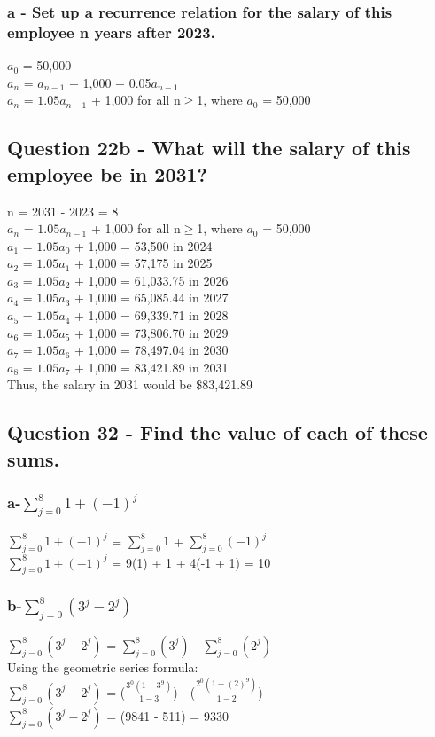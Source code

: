 \documentclass{article}
\begin{document}
\subsubsection[a]{a - Set up a recurrence relation for the salary of this employee n years after 2023.}
$a_0$ = 50,000\\
$a_n$ = $a_{n-1}$ + 1,000 + 0.05$a_{n-1}$\\
$a_n$ = $1.05a_{n-1}$ + 1,000 for all n$\geq$1, where $a_0$ = 50,000\\

\subsection{Question 22b - What will the salary of this employee be in 2031?}
n = 2031 - 2023 = 8\\
$a_n$ = $1.05a_{n-1}$ + 1,000 for all n$\geq$1, where $a_0$ = 50,000\\
$a_1$ = $1.05a_{0}$ + 1,000 = 53,500 in 2024\\
$a_2$ = $1.05a_{1}$ + 1,000 = 57,175 in 2025\\
$a_3$ = $1.05a_{2}$ + 1,000 = 61,033.75 in 2026\\
$a_4$ = $1.05a_{3}$ + 1,000 = 65,085.44 in 2027\\
$a_5$ = $1.05a_{4}$ + 1,000 = 69,339.71 in 2028\\
$a_6$ = $1.05a_{5}$ + 1,000 = 73,806.70 in 2029\\
$a_7$ = $1.05a_{6}$ + 1,000 = 78,497.04 in 2030\\
$a_8$ = $1.05a_{7}$ + 1,000 = 83,421.89 in 2031\\
Thus, the salary in 2031 would be \$83,421.89


\subsection{Question 32 - Find the value of each of these sums.}

\subsubsection[a]{a-$\sum_{j=0}^{8} 1 + (-1)^j $}
$\sum_{j=0}^{8} 1 + (-1)^j $ = $\sum_{j=0}^{8} 1$ + $\sum_{j=0}^{8}(-1)^j $\\
$\sum_{j=0}^{8} 1 + (-1)^j $ = 9(1) + 1 + 4(-1 + 1) = 10

\subsubsection[b]{b-$\sum_{j=0}^{8} (3^j - 2^j) $}
$\sum_{j=0}^{8} (3^j - 2^j) $ = $\sum_{j=0}^{8} (3^j) $ - $\sum_{j=0}^{8} (2^j) $\\
Using the geometric series formula:\\
$\sum_{j=0}^{8} (3^j - 2^j) $ = ($\frac{3^0(1-3^9)}{1-3}$) - ($\frac{2^0(1-(2)^9)}{1-2}$)\\
$\sum_{j=0}^{8} (3^j - 2^j) $ = (9841 - 511) = 9330
\end{document}
